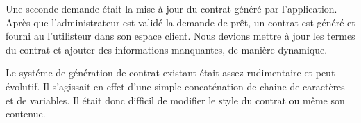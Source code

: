 \bigskip

Une seconde demande était la mise à jour du contrat généré par
l'application. Après que l'administrateur est validé la demande de prêt,
un contrat est généré et fourni au l'utilisteur dans son espace client.
Nous devions mettre à jour les termes du contrat et ajouter des
informations manquantes, de manière dynamique.

\bigskip

Le systéme de génération de contrat existant était assez rudimentaire et
peut évolutif. Il s'agissait en effet d'une simple concaténation de
chaine de caractères et de variables. Il était donc difficil de modifier
le style du contrat ou même son contenue.

\begin{Shaded}
\begin{Highlighting}[]
 \NormalTok{() }\OperatorTok{=}  \OperatorTok{,} \OperatorTok{\{}
   \OperatorTok{=} 
\OperatorTok{;}
  \OperatorTok{+=}  \OperatorTok{+} 
\OperatorTok{;}
  \OperatorTok{+=} 
\OperatorTok{;}
  \OperatorTok{+=}  
\OperatorTok{;}
  \OperatorTok{+=}  \OperatorTok{+} \OperatorTok{;}
  \OperatorTok{+=}  \OperatorTok{+} \OperatorTok{;}
  \OperatorTok{+=}  \OperatorTok{+} 
    \OperatorTok{+}  \OperatorTok{+} 
    \OperatorTok{+}  \OperatorTok{\}}\NormalTok{\} }\OperatorTok{+} \OperatorTok{;}
\NormalTok{\}}
\end{Highlighting}
\end{Shaded}

